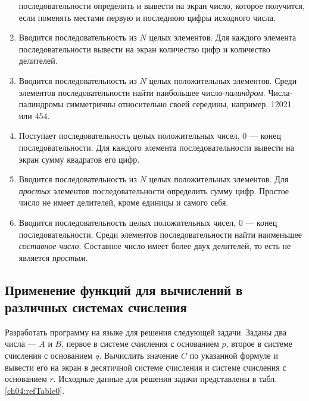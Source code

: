 \begin{enumerate}
последовательности определить и вывести на экран число, которое получится, если поменять местами первую и последнюю
цифры исходного числа.
\item Вводится последовательность из $N$ целых элементов. Для каждого элемента последовательности вывести на экран
количество цифр и количество делителей.
\item Вводится последовательность из $N$ целых положительных элементов. Среди элементов последовательности найти
наибольшее число-\emph{палиндром}. Числа-палиндромы симметричны относительно своей середины, например,
12021 или 454.
\item Поступает последовательность целых положительных чисел, 0 --- конец последовательности. Для каждого элемента
последовательности вывести на экран сумму квадратов его цифр.
\item Вводится последовательность из $N$ целых положительных элементов. Для \emph{простых} элементов
последовательности определить сумму цифр. Простое число не имеет делителей, кроме единицы и самого себя.
\item Вводится последовательность целых положительных чисел, 0 --- конец последовательности. Среди элементов
последовательности найти наименьшее \emph{составное число}. Составное число имеет более двух делителей, то
есть не является \emph{простым}.
\end{enumerate}

\subsection[Применение функций для вычислений в различных системах счисления]{Применение функций для вычислений в
различных системах счисления}
Разработать программу на языке  для решения следующей задачи. Заданы два числа --- $A$ и
$B$, первое в системе счисления с основанием $p$, второе в системе счисления с
основанием $q$. Вычислить значение $C$ по указанной формуле и вывести его на экран
в десятичной системе счисления и системе счисления с основанием $r$. Исходные данные для решения
задачи представлены в табл. \ref{ch04:refTable0}.

